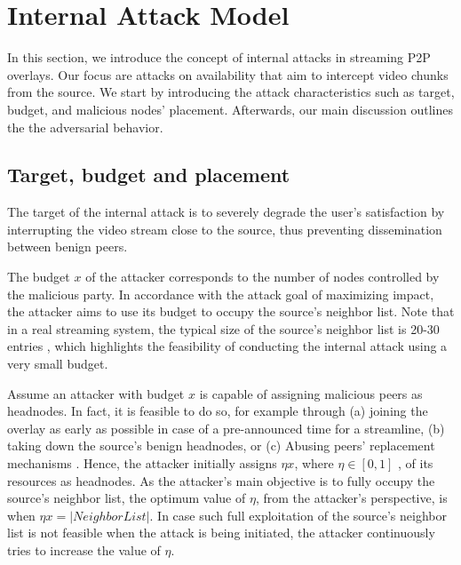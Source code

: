 \section{Internal Attack Model}
\label{sec:Attack}

In this section, we introduce the concept of internal attacks in streaming P2P overlays.
Our focus are attacks on availability that aim to intercept video chunks from the source. 
We start by introducing the attack characteristics such as target, budget, and malicious nodes' placement. 
Afterwards, our main discussion outlines the the \drop adversarial behavior. 

\subsection{Target, budget and placement}


The target of the internal attack is to severely degrade the user's satisfaction by interrupting the video stream close to the source, thus preventing dissemination between benign peers.

The budget $x$ of the attacker corresponds to the number of nodes controlled by the malicious party. 
In accordance with the attack goal of maximizing impact, the attacker aims to use its budget to occupy the source's neighbor list. 
Note that in a real streaming system, the typical size of the source's neighbor list is 20-30 entries \cite{neighborlist1,neighborlist2}, which highlights the feasibility of conducting the internal attack using a very small budget.

Assume an attacker with budget $x$ is capable of assigning malicious peers as headnodes.
In fact, it is feasible to do so, for example through (a) joining the overlay as early as possible in case of a pre-announced time for a streamline, (b) taking down the source's benign headnodes, or (c) Abusing peers' replacement mechanisms \cite{nguyen2016swap}.
Hence, the attacker initially assigns $\eta x$, where $\eta\in [0,1]$ , of its resources as headnodes.
As the attacker's main objective is to fully occupy the source's neighbor list, the optimum value of $\eta$, from the attacker's perspective, is when $\eta x = |NeighborList|$.
In case such full exploitation of the source's neighbor list is not feasible when the attack is being initiated, the attacker continuously tries to increase the value of $\eta$.  

